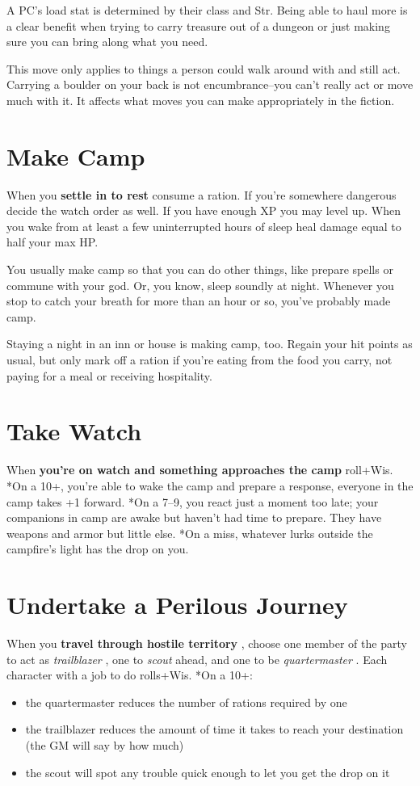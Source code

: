  A PC's load stat is determined by their class and Str. Being able to haul more is a clear benefit when trying to carry treasure out of a dungeon or just making sure you can bring along what you need.


 This move only applies to things a person could walk around with and still act. Carrying a boulder on your back is not encumbrance--you can't really act or move much with it. It affects what moves you can make appropriately in the fiction.
\section{Make Camp}


 When you \textbf{settle in to rest}
 consume a ration. If you're somewhere dangerous decide the watch order as well. If you have enough XP you may level up. When you wake from at least a few uninterrupted hours of sleep heal damage equal to half your max HP.


 You usually make camp so that you can do other things, like prepare spells or commune with your god. Or, you know, sleep soundly at night. Whenever you stop to catch your breath for more than an hour or so, you've probably made camp.


 Staying a night in an inn or house is making camp, too. Regain your hit points as usual, but only mark off a ration if you're eating from the food you carry, not paying for a meal or receiving hospitality.
\section{Take Watch}


 When \textbf{you're on watch and something approaches the camp}
 roll+Wis. *On a 10+, you're able to wake the camp and prepare a response, everyone in the camp takes +1 forward. *On a 7--9, you react just a moment too late; your companions in camp are awake but haven't had time to prepare. They have weapons and armor but little else. *On a miss, whatever lurks outside the campfire's light has the drop on you.
\section{Undertake a Perilous Journey}


 When you \textbf{travel through hostile territory}
, choose one member of the party to act as \emph{trailblazer}
, one to \emph{scout}
 ahead, and one to be \emph{quartermaster}
. Each character with a job to do rolls+Wis. *On a 10+:
\begin{itemize}
\item the quartermaster reduces the number of rations required by one
\item the trailblazer reduces the amount of time it takes to reach your destination (the GM will say by how much)
\item the scout will spot any trouble quick enough to let you get the drop on it

\end{itemize}


